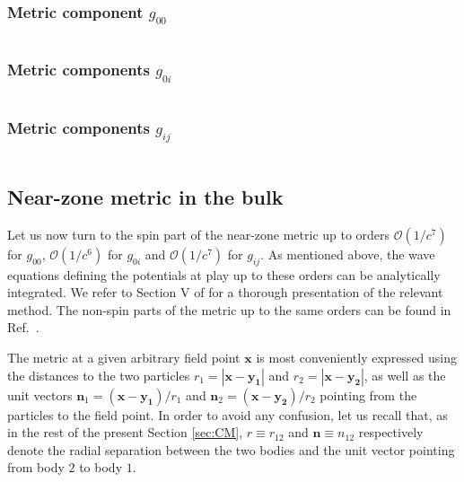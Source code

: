 \documentclass[
superscriptaddress,
preprint,
prd,tightenlines,showpacs,nofootinbib,
eqsecnum,
amsfonts,amsmath,amssymb]{revtex4-1}
\begin{document}
\subsubsection{Metric component $g_{00}$}

\begin{subequations}

\end{subequations}

\subsubsection{Metric components $g_{0i}$}

\begin{subequations}

\end{subequations}

\subsubsection{Metric components $g_{ij}$}

\begin{subequations}

\end{subequations}

\subsection{Near-zone metric in the bulk}
\label{subsec:metricnearzoneCM}

Let us now turn to the spin part of the near-zone metric up to orders
$\mathcal{O}(1/c^7)$ for $g_{00}$, $\mathcal{O}(1/c^6)$ for $g_{0i}$
and $\mathcal{O}(1/c^7)$ for $g_{ij}$. As mentioned above, the wave
equations defining the potentials at play up to these orders can be
analytically integrated. We refer to Section V of \cite{Blanchet1998}
for a thorough presentation of the relevant method. The non-spin parts
of the metric up to the same orders can be found in
Ref.~\cite{Blanchet1998}.

The metric at a given arbitrary field point $\mathbf{x}$ is most
conveniently expressed using the distances to the two particles
$r_1=|\mathbf{x}-\mathbf{y_1}|$ and $r_2=|\mathbf{x}-\mathbf{y_2}|$,
as well as the unit vectors
$\mathbf{n}_1=(\mathbf{x}-\mathbf{y_1})/r_1$ and
$\mathbf{n}_2=(\mathbf{x}-\mathbf{y_2})/r_2$ pointing from the
particles to the field point. In order to avoid any confusion, let us
recall that, as in the rest of the present Section \ref{sec:CM},
$r\equiv r_{12}$ and $\mathbf{n}\equiv n_{12}$ respectively denote the
radial separation between the two bodies and the unit vector pointing
from body $2$ to body $1$.
\end{document}
